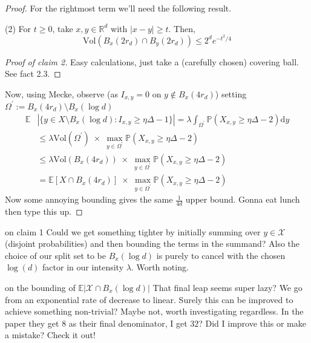 \documentclass{article}
\begin{document}
\begin{proof}
    For the rightmost term we'll need the following result. 
    \begin{claim}[]{(2)}
        For $t \geq 0$, take $x, y \in \mathbb{R}^d$ with $\lvert x - y \rvert \geq t$. Then,
        \[\text{Vol}(B_x(2r_d)\cap B_y(2r_d)) \leq 2^d e^{-t^2/4}\]
    \end{claim}
    \begin{proof}[Proof of claim 2]
        Easy calculations, just take a (carefully chosen) covering ball. See \cite{campos2023} fact 2.3.
    \end{proof}
    Now, using Mecke, observe (as $I_{x,y} = 0$ on $y \notin B_{x}(4r_d)$) setting $\Omega^\prime 
    := B_x(4r_d) \setminus B_x(\log d)$
    \begin{align*}
        \mathbb{E}&|\{y \in X \setminus B_x(\log d) : I_{x,y} \geq \eta \Delta - 1\}| 
        = \lambda \int_{\Omega^\prime}\mathbb{P}(X_{x,y} \geq \eta \Delta - 2)\mathrm{d}y \\
        &\leq \lambda \text{Vol}(\Omega^\prime) \; \times \;\max_{y \in \Omega^\prime}\mathbb{P}(X_{x,y} \geq \eta \Delta - 2) \\
        &\leq \lambda \text{Vol}(B_x(4r_d)) \; \times \; \max_{y \in \Omega^\prime}\mathbb{P}(X_{x,y} \geq \eta \Delta - 2) \\
        &= \mathbb{E}[X \cap B_x(4r_d)] \; \times \; \max_{y \in \Omega^\prime}\mathbb{P}(X_{x,y} \geq \eta \Delta - 2)
    \end{align*}
    Now some annoying bounding gives the same $\frac{1}{4d}$ upper bound. Gonna eat lunch then type this up.
\end{proof}

\begin{remark}[]{on claim 1}
    Could we get something tighter by initially summing over $y \in \mathcal{X}$ (disjoint probabilities) and 
    then bounding the terms in the summand? Also the choice of our split set to be $B_x(\log d)$ is purely to 
    cancel with the chosen $\log(d)$ factor in our intensity $\lambda$. Worth noting. 
\end{remark}

\begin{remark}[]{on the bounding of $\mathbb{E}|\mathcal{X} \cap B_x(\log d)|$}
    That final leap seems super lazy? We go from an exponential rate of decrease to linear. Surely this can be 
    improved to achieve something non-trivial? Maybe not, worth investigating regardless. In the paper they get 
    $8$ as their final denominator, I get $32$? Did I improve this or make a mistake? Check it out! 
\end{remark}
\end{document}
